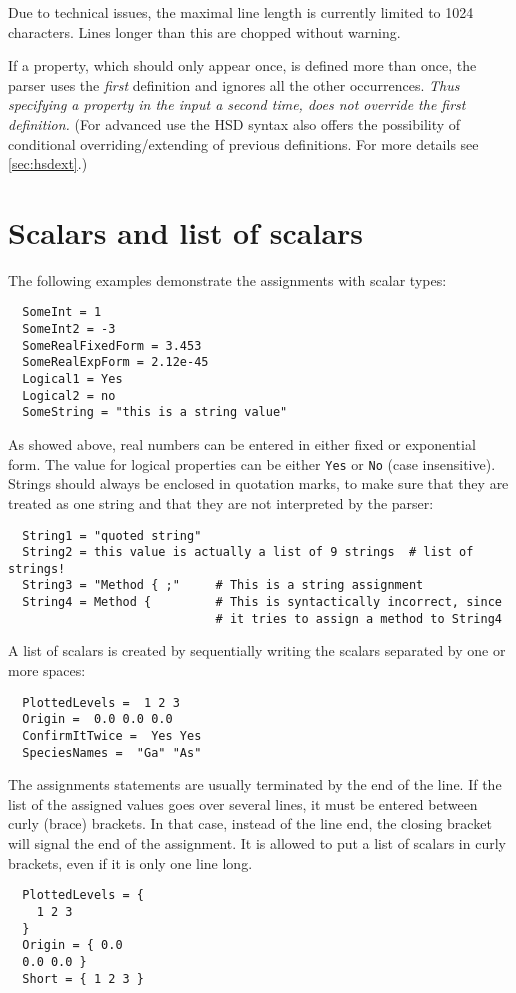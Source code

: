 Due to technical issues, the maximal line length is currently limited to 1024
characters. Lines longer than this are chopped without warning.

If a property, which should only appear once, is defined more than once, the
parser uses the \emph{first} definition and ignores all the other occurrences.
\emph{Thus specifying a property in the input a second time, does not override
  the first definition.} (For advanced use the HSD syntax also offers the
possibility of conditional overriding/extending of previous definitions. For
more details see \ref{sec:hsdext}.)


\section{Scalars and list of scalars}

The following examples demonstrate the assignments with scalar types:
\begin{verbatim}
  SomeInt = 1
  SomeInt2 = -3
  SomeRealFixedForm = 3.453
  SomeRealExpForm = 2.12e-45
  Logical1 = Yes
  Logical2 = no
  SomeString = "this is a string value"
\end{verbatim}

As showed above, real numbers can be entered in either fixed or
exponential form. The value for logical properties can be either
\verb|Yes| or \verb|No| (case insensitive). Strings should always be
enclosed in quotation marks, to make sure that they are treated as one
string and that they are not interpreted by the parser:
\begin{verbatim}
  String1 = "quoted string"
  String2 = this value is actually a list of 9 strings  # list of strings!
  String3 = "Method { ;"     # This is a string assignment
  String4 = Method {         # This is syntactically incorrect, since
                             # it tries to assign a method to String4
\end{verbatim}

A list of scalars is created by sequentially writing the scalars
separated by one or more spaces:
\begin{verbatim}
  PlottedLevels =  1 2 3
  Origin =  0.0 0.0 0.0
  ConfirmItTwice =  Yes Yes
  SpeciesNames =  "Ga" "As"
\end{verbatim}

The assignments statements are usually terminated by the end of the
line.  If the list of the assigned values goes over several lines, it
must be entered between curly (brace) brackets. In that case, instead
of the line end, the closing bracket will signal the end of the
assignment.  It is allowed to put a list of scalars in curly brackets,
even if it is only one line long.
\begin{verbatim}
  PlottedLevels = {
    1 2 3
  }
  Origin = { 0.0
  0.0 0.0 }
  Short = { 1 2 3 }
\end{verbatim}

